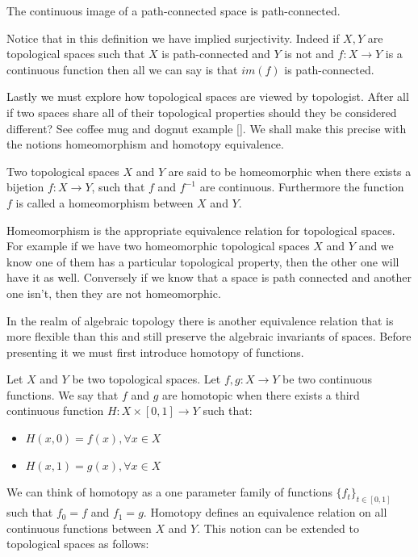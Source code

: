\begin{prop} The continuous image of a path-connected space is path-connected. \end{prop}

    Notice that in this definition we have implied surjectivity. Indeed if $X, Y$ are topological spaces such that $X$ is path-connected and $Y$ is not and $f : X \to Y$ is a continuous function then all we can say is that $im(f)$ is path-connected.

Lastly we must explore how topological spaces are viewed by topologist. After all if two spaces share all of their topological properties should they be considered different? See coffee mug and dognut example []. We shall make this precise with the notions homeomorphism and homotopy equivalence.

\begin{defn} Two topological spaces $X$ and $Y$ are said to be homeomorphic when there exists a bijetion $f : X \to Y$, such that $f$ and $f^{-1}$ are continuous. Furthermore the function $f$ is called a homeomorphism between $X$ and $Y$.  \end{defn}

Homeomorphism is the appropriate equivalence relation for topological spaces. For example if we have two homeomorphic topological spaces $X$ and $Y$ and we know one of them has a particular topological property, then the other one will have it as well. Conversely if we know that a space is path connected and another one isn't, then they are not homeomorphic.

In the realm of algebraic topology there is another equivalence relation that is more flexible than this and still preserve the algebraic invariants of spaces. Before presenting it we must first introduce homotopy of functions.


\begin{defn} Let $X$ and $Y$ be two topological spaces. Let $f, g: X \to Y$ be two continuous functions. We say that $f$ and $g$ are homotopic when there exists a third continuous function $H:X \times [0, 1] \to Y$ such that:  \end{defn}

\begin{itemize}
    \item $H(x, 0) = f(x), \forall x\in X$
    \item $H(x, 1) = g(x), \forall x\in X$
\end{itemize}

We can think of homotopy as a one parameter family of functions $\{f_t\}_{t \in [0, 1]}$ such that $f_0 = f$ and $f_1 = g$. Homotopy defines an equivalence relation on all continuous functions between $X$ and $Y$. This notion can be extended to topological spaces as follows:


